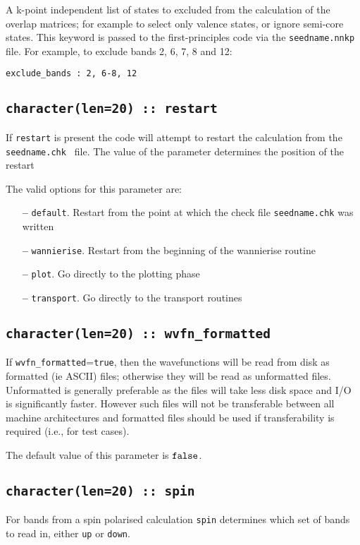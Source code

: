 A k-point independent list of states to excluded from the calculation
 of the overlap matrices; 
 for example to select only valence states, or ignore semi-core states.
 This keyword is passed to the first-principles code via the
 {\tt seedname.nnkp} file. For example, to exclude bands 2, 6, 7, 8
 and 12:

 \verb#exclude_bands : 2, 6-8, 12# 

\subsection[restart]{\tt character(len=20) :: restart}

If \verb#restart# is present the code will attempt to restart the calculation
from the {\tt seedname.chk } file. The value of the parameter
determines the position of the restart

The valid options for this parameter are:
\begin{itemize}
\item[{\bf --}]  \verb#default#. Restart from the point at which the
  check file {\tt seedname.chk} was written  
\item[{\bf --}]  \verb#wannierise#. Restart from the beginning of the
  wannierise routine 
\item[{\bf --}]  \verb#plot#. Go directly to the plotting phase 
\item[{\bf --}]  \verb#transport#. Go directly to the transport routines


\end{itemize}



\subsection[wvfn\_formated]{\tt character(len=20) :: wvfn\_formatted}

If \verb#wvfn_formatted#=\verb#true#, then the wavefunctions will be
read from disk as formatted (ie ASCII) files; otherwise they will be
read as unformatted files. Unformatted is generally preferable as the
files will take less disk space and I/O is significantly
faster. However such files will not be transferable between all
machine architectures and formatted files should be used if
transferability is required (i.e., for test cases).

The default value of this parameter is $\verb#false#$.


\subsection[spin]{\tt character(len=20) :: spin}
For bands from a spin polarised calculation {\tt spin} determines which set
of bands to read in, either \verb#up# or \verb#down#.


